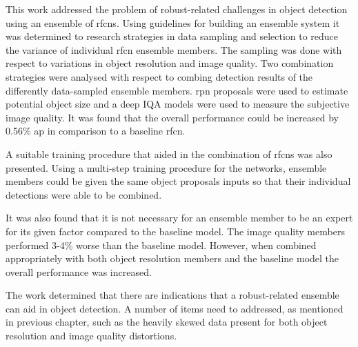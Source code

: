 This work addressed the problem of robust-related challenges in object detection using an ensemble of \glspl{rfcn}. Using guidelines for building an ensemble system it was determined to research strategies in data sampling and selection to reduce the variance of individual \gls{rfcn} ensemble members. The sampling was done with respect to variations in object resolution and image quality. Two combination strategies were analysed with respect to combing detection results of the differently data-sampled ensemble members. \gls{rpn} proposals were used to estimate potential object size and a deep IQA models were used to measure the subjective image quality. It was found that the overall performance could be increased by 0.56\% \gls{ap} in comparison to a baseline \gls{rfcn}. 

A suitable training procedure that aided in the combination of \glspl{rfcn} was also presented. Using a multi-step training procedure for the networks, ensemble members could be given the same object proposals inputs so that their individual detections were able to be combined. 

It was also found that it is not necessary for an ensemble member to be an expert for its given factor compared to the baseline model. The image quality members performed 3-4\% worse than the baseline model. However, when combined appropriately with both object resolution members and the baseline model the overall performance was increased.

The work determined that there are indications that a robust-related ensemble can aid in object detection. A number of items need to addressed, as mentioned in previous chapter, such as the heavily skewed data present for both object resolution and image quality distortions. 